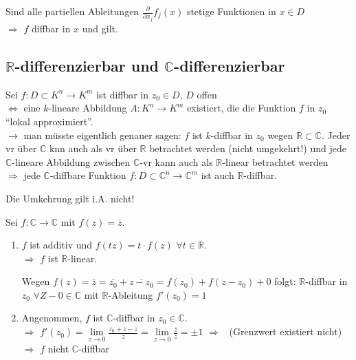 \begin{underlinedenvironment}[Ausblick]
	Sind alle partiellen Ableitungen $\frac{\partial}{\partial x_j} f_j(x)$ stetige Funktionen in $x\in D$ \\
	$\Rightarrow$ $f$ \gls{diffbar} in $x$ und  gilt.
\end{underlinedenvironment}

\subsection*{$\mathbf{\mathbb{R}}$-differenzierbar und $\mathbf{\mathbb{C}}$-differenzierbar}
Sei $f:D\subset K^n\to K^m$ ist \gls{diffbar} in $z_0 \in D$, $D$ offen \\
$\Leftrightarrow$ eine $k$-lineare Abbildung $A:K^n\to K^m$ existiert, die die Funktion $f$ in $z_0$ "`lokal approximiert"'. \\
$\rightarrow$ man müsste eigentlich genauer sagen: $f$ ist $k$-\gls{diffbar} in $z_0$ wegen $\mathbb{R}\subset\mathbb{C}$. Jeder \gls{vr} über $\mathbb{C}$ knn auch als \gls{vr} über $\mathbb{R}$ betrachtet werden (nicht umgekehrt!) und jede $\mathbb{C}$-lineare Abbildung zwischen $\mathbb{C}$-\gls{vr} kann auch als $\mathbb{R}$-linear betrachtet werden\\
$\Rightarrow$ jede $\mathbb{C}$-\gls{diffbar}e Funktion $f:D\subset \mathbb{C}^n\to \mathbb{C}^m$ ist auch $\mathbb{R}$-\gls{diffbar}.

Die Umkehrung gilt i.A. nicht!

\begin{example}
	Sei $f:\mathbb{C}\to\mathbb{C}$ mit $f(z) = \overline{z}$.
	\begin{enumerate}[label={\alph*)}]
		\item $f$ ist additiv und $f(tz) = t\cdot f(z)$ $\forall t\in \mathbb{R}$. \\
		$\Rightarrow$ $f$ ist $\mathbb{R}$-linear.
		
		Wegen $f(z) = \overline{z} = \overline{z_0} + \overline{z - z_0} = f(z_0) + f(z - z_0) + 0$ folgt: $\mathbb{R}$-\gls{diffbar} in $z_0$ $\forall Z-0\in\mathbb{C}$ mit $\mathbb{R}$-Ableitung $f'(z_0) = 1$
		
		\item Angenommen, $f$ ist $\mathbb{C}$-\gls{diffbar} in $z_0\in\mathbb{C}$.\\
		$\Rightarrow$ $f'(z_0) = \lim\limits_{z\to 0} \frac{\overline{z_0 + z} - \overline{z}}{z} = \lim\limits_{z\to 0} \frac{\overline{z}}{z} = \pm 1$ $\Rightarrow$ \Lightning\ (Grenzwert existiert nicht) \\
		$\Rightarrow$ $f$ nicht $\mathbb{C}$-\gls{diffbar}
	\end{enumerate}
\end{example}

